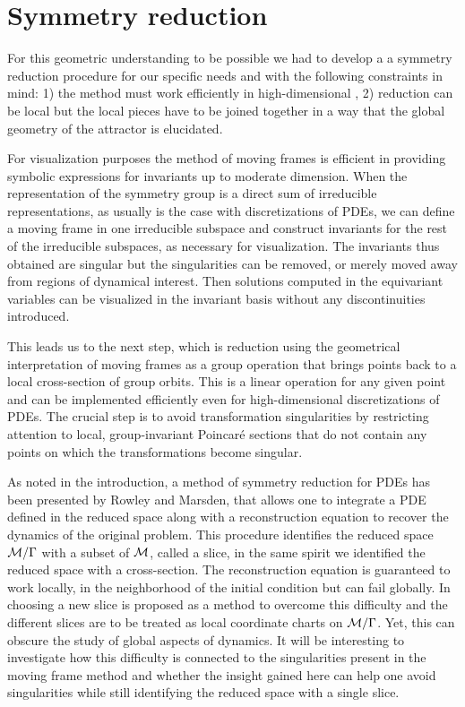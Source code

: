 \section{Symmetry reduction}

For this geometric understanding to be possible we had to develop a
a symmetry reduction procedure for our specific needs
and with the following
constraints in mind:
1) the method must work efficiently in high-dimensional \statesp, 2) reduction
can be local but the local pieces have to be joined together in
a way that the global geometry of the attractor is elucidated.

For visualization purposes the method of moving frames is efficient in providing
symbolic expressions for invariants up to moderate dimension. When the
representation of the symmetry group is a direct sum of irreducible representations,
as usually is the case with discretizations of PDEs, we can define a moving
frame in one irreducible subspace and construct invariants for the rest of
the irreducible subspaces, as necessary for visualization.
The invariants thus obtained are singular but the singularities can be removed,
or merely moved away from regions of dynamical interest.
Then solutions computed in the equivariant variables can be visualized
in the invariant basis without any discontinuities introduced.

This leads us to the next step, which is reduction using the
geometrical interpretation of moving frames as a group
operation that brings points back to a local cross-section of
group orbits. This is a linear operation for any given point
and can be implemented efficiently even for high-dimensional
discretizations of PDEs. The crucial step is to avoid
transformation singularities by restricting attention to
local, group-invariant Poincar\'e sections that do not
contain any points on which the transformations become
singular.

As noted in the introduction, a method of symmetry reduction
for PDEs has been presented by Rowley and
Marsden, that allows one to
integrate a PDE defined in the reduced space along with a
reconstruction equation to recover the dynamics of the
original problem. This procedure identifies the reduced space
$\mathcal{M}/\Gamma$ with a subset of $\mathcal{M}$, called a slice, in
the same spirit we identified the reduced space with a
cross-section. The reconstruction equation is guaranteed to
work locally, in the neighborhood of the initial condition
but can fail globally. In 
choosing a new slice is proposed as a method to overcome this
difficulty and the different slices are to be treated as
local coordinate charts on $\mathcal{M}/\Gamma$. Yet, this can
obscure the study of global aspects of dynamics. It will be
interesting to investigate how this difficulty is connected
to the singularities present in the moving frame method and
whether the insight gained here can help one avoid
singularities while still identifying the reduced space with
a single slice.


